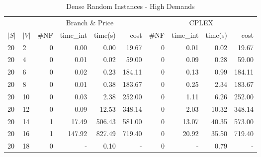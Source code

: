 \begin{appendices}
\begin{table*}[h]
\scriptsize
\begin{center}
\caption{Dense Random Instances - High Demands}
\begin{tabular} {l l | r r r r | r r r r}
\hline
       &                                 &  \multicolumn{4}{c|}{Branch \& Price}                                & \multicolumn{4}{c}{CPLEX}                 \\
 $|S|$ & $|V|$                           &  \#NF  & time\_int     &  time(s)      &  cost            &  \#NF   &  time\_int   &  time(s)       &  cost       \\ 
\hline                                                                                                                                               
20 & 2                                  &  0           &  0.00        &  0.00        & 19.67           &  0            &  0.01        & 0.02         & 19.67       \\ 
20 & 4                                  &  0           &  0.01        &  0.02        & 59.00           &  0            &  0.09        & 0.28         & 59.00       \\ 
20 & 6                                  &  0           &  0.02        &  0.23        & 184.11          &  0            &  0.13        & 0.99         & 184.11      \\ 
20 & 8                                  &  0           &  0.01        &  0.38        & 183.67          &  0            &  0.25        & 2.34         & 183.67      \\ 
20 & 10                                 &  0           &  0.03        &  2.38        & 252.00          &  0            &  1.11        & 6.26         & 252.00      \\ 
20 & 12                                 &  0           &  0.09        &  12.53       & 348.14          &  0            &  2.03        & 10.32        & 348.14      \\ 
20 & 14                                 &  1           &  17.49       &  506.43      & 581.00          &  0            &  13.07       & 40.35        & 573.00      \\ 
20 & 16                                 &  1           &  147.92      &  827.49      & 719.40          &  0            &  20.92       & 35.50        & 719.40      \\ 
20 & 18                                 &  0           &  -           &  0.10        & -               &  0            &  -           & 0.79         & -           \\ 

\end{tabular}
\end{center}
\end{table*}
\end{appendices}
